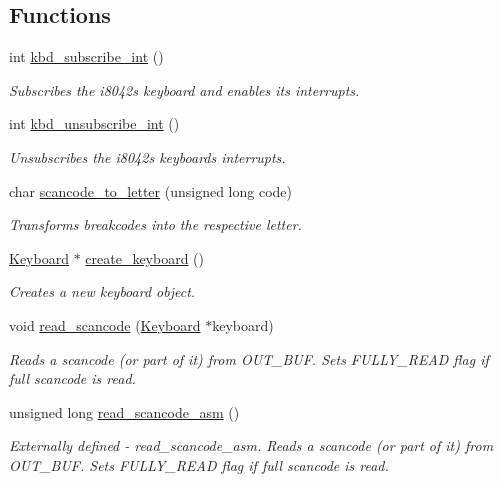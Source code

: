 \subsection*{Functions}
\begin{DoxyCompactItemize}
\item 
int \hyperlink{group__keyboard_ga77e2ed8f53e0fae3f4005fa26c6d2692}{kbd\+\_\+subscribe\+\_\+int} ()
\begin{DoxyCompactList}\small\item\em Subscribes the i8042\textquotesingle{}s keyboard and enables its interrupts. \end{DoxyCompactList}\item 
int \hyperlink{group__keyboard_ga5bdf6cfb570c375192b0d87913b65c57}{kbd\+\_\+unsubscribe\+\_\+int} ()
\begin{DoxyCompactList}\small\item\em Unsubscribes the i8042\textquotesingle{}s keyboard\textquotesingle{}s interrupts. \end{DoxyCompactList}\item 
char \hyperlink{group__keyboard_ga837f1700d58c441769ddcfdae9792f13}{scancode\+\_\+to\+\_\+letter} (unsigned long code)
\begin{DoxyCompactList}\small\item\em Transforms breakcodes into the respective letter. \end{DoxyCompactList}\item 
\hyperlink{struct_keyboard}{Keyboard} $\ast$ \hyperlink{group__keyboard_ga12648eff06090040743ce7b51875afec}{create\+\_\+keyboard} ()
\begin{DoxyCompactList}\small\item\em Creates a new keyboard \textquotesingle{}object\textquotesingle{}. \end{DoxyCompactList}\item 
void \hyperlink{group__keyboard_ga97b5d5bf543266e60da0cc33c00aefad}{read\+\_\+scancode} (\hyperlink{struct_keyboard}{Keyboard} $\ast$keyboard)
\begin{DoxyCompactList}\small\item\em Reads a scancode (or part of it) from O\+U\+T\+\_\+\+B\+UF. Sets F\+U\+L\+L\+Y\+\_\+\+R\+E\+AD flag if full scancode is read. \end{DoxyCompactList}\item 
unsigned long \hyperlink{group__keyboard_ga4f6e388e1ad885350358a234aeed5be7}{read\+\_\+scancode\+\_\+asm} ()
\begin{DoxyCompactList}\small\item\em Externally defined -\/ read\+\_\+scancode\+\_\+asm. Reads a scancode (or part of it) from O\+U\+T\+\_\+\+B\+UF. Sets F\+U\+L\+L\+Y\+\_\+\+R\+E\+AD flag if full scancode is read. \end{DoxyCompactList}\item 

\end{DoxyCompactItemize}
